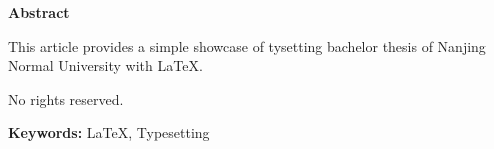 \clearpage
\thispagestyle{plain}
{}

\centerline{\bfseries Abstract}

\linespread{1.4}
\bigskip

This article provides a simple showcase of tysetting bachelor thesis of Nanjing Normal University with \LaTeX.

No rights reserved.

\bigskip
\noindent\textbf{ Keywords:} 
\LaTeX, Typesetting

